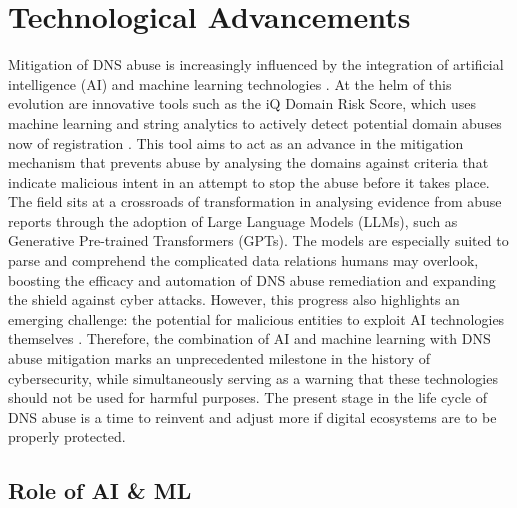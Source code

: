 \section{Technological Advancements}

Mitigation of DNS abuse is increasingly influenced by the integration of artificial intelligence (AI) and machine learning technologies \cite{goethals2021enabling}. At the helm of this evolution are innovative tools such as the iQ Domain Risk Score, which uses machine learning and string analytics to actively detect potential domain abuses now of registration \cite{dnsabuseAI2023}. This tool aims to act as an advance in the mitigation mechanism that prevents abuse by analysing the domains against criteria that indicate malicious intent in an attempt to stop the abuse before it takes place. The field sits at a crossroads of transformation in analysing evidence from abuse reports through the adoption of Large Language Models (LLMs), such as Generative Pre-trained Transformers (GPTs). The models are especially suited to parse and comprehend the complicated data relations humans may overlook, boosting the efficacy and automation of DNS abuse remediation and expanding the shield against cyber attacks. However, this progress also highlights an emerging challenge: the potential for malicious entities to exploit AI technologies themselves \cite{halvorsenAI2023}. Therefore, the combination of AI and machine learning with DNS abuse mitigation marks an unprecedented milestone in the history of cybersecurity, while simultaneously serving as a warning that these technologies should not be used for harmful purposes. The present stage in the life cycle of DNS abuse is a time to reinvent and adjust more if digital ecosystems are to be properly protected.

\subsection{Role of AI \& ML}


